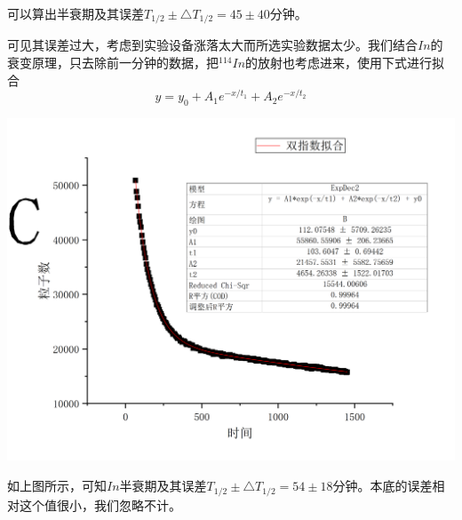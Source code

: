 \documentclass[hyperref]{ctexart}
\begin{document}
\begin{multicols}{2}
	可以算出半衰期及其误差$T_{1/2} \pm \triangle T_{1/2}=45\pm40$分钟。

	可见其误差过大，考虑到实验设备涨落太大而所选实验数据太少。我们结合$In$的衰变原理，只去除前一分钟的数据，把$^{114}In$的放射也考虑进来，使用下式进行拟合
	\begin{equation}
	y=y_0+A_1e^{-x/t_1}+A_2e^{-x/t_2}
	\end{equation}
	\begin{center}\includegraphics[scale=0.3]{t32}\end{center}
	如上图所示，可知$In$半衰期及其误差$T_{1/2} \pm \triangle T_{1/2}=54 \pm 18$分钟。本底的误差相对这个值很小，我们忽略不计。


\end{multicols}
\end{document}
